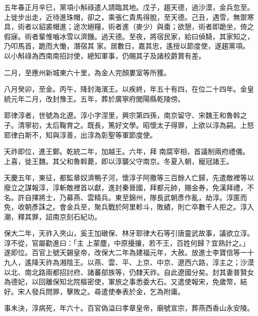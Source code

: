 
\begin{pinyinscope}

 五年春正月辛巳，黨項小斛祿遣人請臨其地。戊子，趨天德，過沙漠，金兵忽至。上徙步出走，近待進珠帽，卻之，乘張仁貴馬得脫，至天德。己丑，遇雪，無禦寒具，術者以貂裘帽進；途次絕糧，術者進（麥少）與棗；欲憩，術者即跪坐，倚之假寐。術者輩惟嚙冰雪以濟饑。過天德。至夜，將宿民家，給曰偵騎，其家知之，乃叩馬首，跪而大慟，潛宿其
 家。居數日，嘉其忠，遙授以節度使，遂趨黨項。以小斛祿為西南南招討使，總知軍事，仍賜其子及諸校爵賞有差。



 二月，至應州新城東六十里，為金人完顏婁室等所獲。



 八月癸卯，至金。丙午，降封海濱王。以疾終，年五十有四，在位二十四年。金皇統元年二月，改封豫王。五年，葬於廣寧府閭陽縣乾陵傍。



 耶律淳者，世號為北遼。淳小字涅里，興宗第四孫，南京留守、宋魏王和魯斡之子。清寧初，太后鞠育之。既長，篤好文學。昭懷太子得罪，上欲以淳為嗣。上怒耶律白斯不，知與淳善，出淳為彰聖等軍節度使。



 天祚即位，進王鄭。乾統二年，加越王。六年，拜
 南腐宰相，首議制兩府禮儀。上喜，徙王魏。其父和魯斡薨，即以淳襲父守南京。冬夏入朝，寵冠諸王。



 天慶五年，東征，都監章奴濟鴨子河，懷淳子阿撒等三百餘人亡歸，先遣敵裡等以廢立之謀報淳，淳斬敵裡首以獻，進封秦晉國，拜都元帥，賜金券，免漢拜禮，不名。許自擇將士，乃募燕、雲精兵。東至錦州，隊長武朝彥作亂，劫淳。淳匿而免，收朝彥誅之。會金兵至，聚兵戰於阿里軫斗，敗績，則亡卒數千人拒之。淳入潮，釋其罪，詔南京刻石紀功。



 保大二年，天祚入夾山，奚王加礅保、林牙耶律大石等引唐靈武故事，議欲立淳。淳不從，官屬勸進曰：「主
 上蒙塵，中原擾攘，若不王，百姓何歸？宜熟計之。」遂即位。百官上號天錫皇帝，改保大二年為建福元年，大赦。放進士李寶信等一十九人，遙降天祚為湘陰王。以燕、雲、平、上京、中京、遼西六路，淳主之；沙漠以北、南北路兩都招討府、諸蕃部族等，仍隸天祚。自此遼國分矣。封其妻普賢女為德妃，以回離保知北院樞密使，軍旅之事悉委大石。又遣使報宋，免歲幣，結好。宋人發兵問罪，擊敗之。尋遣使奉表於金，乞為附庸。



 事未決，淳病死，年六十。百官偽溢曰孝章皇帝，廟號宣宗，葬燕西香山永安陵。




\end{pinyinscope}
